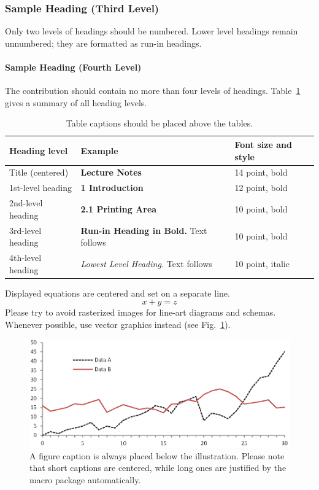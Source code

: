 \documentclass{llncs}
\begin{document}
\subsubsection{Sample Heading (Third Level)} Only two levels of
headings should be numbered. Lower level headings remain unnumbered;
they are formatted as run-in headings.

\paragraph{Sample Heading (Fourth Level)}
The contribution should contain no more than four levels of
headings. Table~\ref{tab1} gives a summary of all heading levels.

\begin{table}
\caption{Table captions should be placed above the
tables.}\label{tab1}
\begin{tabular}{|l|l|l|}
\hline
Heading level &  Example & Font size and style\\
\hline
Title (centered) &  {\Large\bfseries Lecture Notes} & 14 point, bold\\
1st-level heading &  {\large\bfseries 1 Introduction} & 12 point, bold\\
2nd-level heading & {\bfseries 2.1 Printing Area} & 10 point, bold\\
3rd-level heading & {\bfseries Run-in Heading in Bold.} Text follows & 10 point, bold\\
4th-level heading & {\itshape Lowest Level Heading.} Text follows & 10 point, italic\\
\hline
\end{tabular}
\end{table}


\noindent Displayed equations are centered and set on a separate
line.
\begin{equation}
x + y = z
\end{equation}
Please try to avoid rasterized images for line-art diagrams and
schemas. Whenever possible, use vector graphics instead (see
Fig.~\ref{fig1}).

\begin{figure}
\includegraphics[width=\textwidth]{fig1.eps}
\caption{A figure caption is always placed below the illustration.
Please note that short captions are centered, while long ones are
justified by the macro package automatically.} \label{fig1}
\end{figure}
\end{document}
